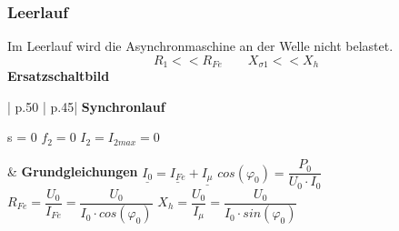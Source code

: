     \subsubsection{Leerlauf}
    \begin{multicols}{2}
        \begin{minipage}{\linewidth}
            Im Leerlauf wird die Asynchronmaschine an der \newline Welle nicht belastet.
            \[ R_1 << R_{Fe} \qquad X_{\sigma 1} << X_h\]
            \textbf{Ersatzschaltbild}\newline
        \end{minipage}
        
        \begin{minipage}{\linewidth}
        \end{minipage}
    \end{multicols} 
    \begin{longtable}{| p{.50\textwidth} | p{.45\textwidth}|}
        \hline
         \textbf{Synchronlauf} \newline
         \begin{minipage}{0.5\linewidth}    
         s = 0 \newline
         $ f_2 = 0 $\newline
         $ I_2 = I_{2max} = 0$\newline\newline
        \end{minipage}
         &
         \textbf{Grundgleichungen}\newline
         $ \underline{I_0}=\underline{I_{Fe}} + \underline{I_\mu} $\newline
          $ cos(\varphi_0)= \dfrac{P_0}{U_0 \cdot I_0} $\newline
          $ R_{Fe}=\dfrac{U_0}{I_{Fe}}=\dfrac{U_0}{I_0 \cdot cos(\varphi_0)} $\newline
           $ X_h = \dfrac{U_0}{I_\mu}=\dfrac{U_0}{I_0 \cdot sin(\varphi_0)} $
         \\ \hline
    \end{longtable}
    
